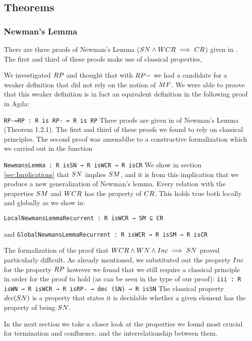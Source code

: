 \subsection{Theorems}
\subsubsection{Newman's Lemma}
There are three proofs of Newman's Lemma ($\SN \land \WCR \implies \CR$) given in \terese. 
The first and third of these proofs make use of classical properties, 


We investigated $\RP$ and thought that with $\RPm$ we had a candidate for a weaker definition that 
did not rely on the notion of $\MF$. We were able to proove that this weaker definition is 
in fact an equivalent definition in the following proof in Agda: 

\verb|RP-↔RP : R is RP- ↔ R is RP| \footnotemark[1]
Three proofs are given in \terese of Newman's Lemma (Theorem 1.2.1). The first and third of 
these proofs we found to rely on classical principles. The second proof was amenablbe to a 
constructive formalization which we carried out in the function 


\verb|NewmansLemma : R isSN → R isWCR → R isCR| \footnotemark[2]
We show in section \ref{sec:Implications} that $\SN$ implies $\SM$, and it is from this implication 
that we produce a new generalization of Newman's lemma. Every relation with the properties 
$\SM$ and $\WCR$ has the property of $\CR$. This holds true both locally and globally as we show in:

\verb|LocalNewmansLemmaRecurrent : R isWCR → SM ⊆ CR| \footnotemark[2]

and \verb|GlobalNewmansLemmaRecurrent : R isWCR → R isSM → R isCR| \footnotemark[2]

The formalization of the proof that $\WCR \land \WN \land \Inc \implies \SN$ proved particularly difficult. 
As already mentioned, we substituted out the property $\Inc$ for the property $\RP$ however 
we found that we still require a classical principle in order for the proof to hold (as can be seen in the type of our proof):
\verb|iii : R isWN → R isWCR → R isRP- → dec (SN) → R isSN| \footnotemark[3] 
The classical property $\decSN$ is a property that states it is decidable whether a given 
element has the property of being $\SN$. 

In the next section we take a closer look at the properties we found most crucial for termination and confluence, and the interrelationship between them.

